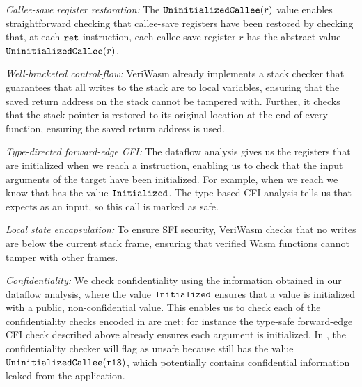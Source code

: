 \begin{CompactEnumerate}
\item

  \emph{Callee-save register restoration:}
  The $\mathtt{UninitializedCallee}({r})$ value enables straightforward checking that callee-save
  registers have been restored by checking that, at each $\mathtt{ret}$
  instruction, each callee-save register $r$ has the abstract value
  $\mathtt{UninitializedCallee}({r})$.

\item

  \emph{Well-bracketed control-flow:}
  VeriWasm already implements a stack checker that guarantees that all writes to
  the stack are to local variables, ensuring that the saved return address on the stack
  cannot be tampered with.
  Further, it checks that the stack pointer is restored to its original
  location at the end of every function, ensuring the saved return address is used.

\item

  \emph{Type-directed forward-edge CFI:}
  The dataflow analysis gives us the registers that are initialized when we
  reach a  instruction, enabling us to check that the input arguments
  of the target have been initialized.
  For example, when we reach  we know that
   has the value $\mathtt{Initialized}$.
  The type-based CFI analysis tells us that 
  expects  as an input, so this call is marked as safe.

\item

  \emph{Local state encapsulation:}
  To ensure SFI security, VeriWasm checks that no writes are
  below the current stack frame, ensuring that verified Wasm functions cannot
  tamper with other frames.

\item

  \emph{Confidentiality:}
  We check confidentiality using the information obtained in our dataflow
  analysis, where the value $\mathtt{Initialized}$ ensures that a value is initialized with a
  public, non-confidential value.
  This enables us to check each of the confidentiality checks encoded in
  \olangname{} are met: for instance the type-safe forward-edge CFI check
  described above already ensures each argument is initialized.
  In , the confidentiality checker will flag
   as unsafe because  still has
  the value $\mathtt{UninitializedCallee}({\mathtt{r13}})$, which potentially contains confidential information
  leaked from the application.
\end{CompactEnumerate}


